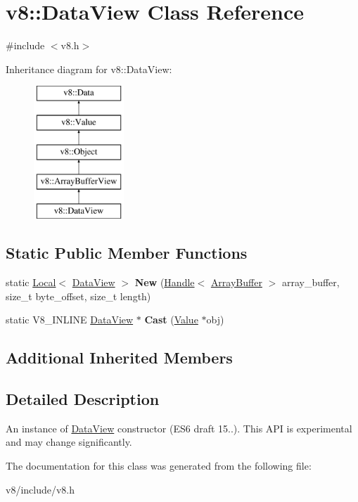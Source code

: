 \hypertarget{classv8_1_1DataView}{}\section{v8\+:\+:Data\+View Class Reference}
\label{classv8_1_1DataView}


{\ttfamily \#include $<$v8.\+h$>$}

Inheritance diagram for v8\+:\+:Data\+View\+:\begin{figure}[H]
\begin{center}
\leavevmode
\includegraphics[height=5.000000cm]{classv8_1_1DataView}
\end{center}
\end{figure}
\subsection*{Static Public Member Functions}
\begin{DoxyCompactItemize}
\item 
\hypertarget{classv8_1_1DataView_a5157c044dbb50669bc2977ea7482aa32}{}static \hyperlink{classv8_1_1Local}{Local}$<$ \hyperlink{classv8_1_1DataView}{Data\+View} $>$ {\bfseries New} (\hyperlink{classv8_1_1Handle}{Handle}$<$ \hyperlink{classv8_1_1ArrayBuffer}{Array\+Buffer} $>$ array\+\_\+buffer, size\+\_\+t byte\+\_\+offset, size\+\_\+t length)\label{classv8_1_1DataView_a5157c044dbb50669bc2977ea7482aa32}

\item 
\hypertarget{classv8_1_1DataView_aa97d15fcb28c6c002a52d32877c8fd3a}{}static V8\+\_\+\+I\+N\+L\+I\+N\+E \hyperlink{classv8_1_1DataView}{Data\+View} $\ast$ {\bfseries Cast} (\hyperlink{classv8_1_1Value}{Value} $\ast$obj)\label{classv8_1_1DataView_aa97d15fcb28c6c002a52d32877c8fd3a}

\end{DoxyCompactItemize}
\subsection*{Additional Inherited Members}


\subsection{Detailed Description}
An instance of \hyperlink{classv8_1_1DataView}{Data\+View} constructor (E\+S6 draft 15..). This A\+P\+I is experimental and may change significantly. 

The documentation for this class was generated from the following file\+:\begin{DoxyCompactItemize}
\item 
v8/include/v8.\+h\end{DoxyCompactItemize}
